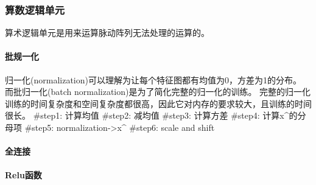 \subsubsection{算数逻辑单元}
算术逻辑单元是用来运算脉动阵列无法处理的运算的。

\paragraph{批规一化}
归一化(normalization)可以理解为让每个特征图都有均值为0，方差为1的分布。
而批归一化(batch normalization)是为了简化完整的归一化的训练。
完整的归一化训练的时间复杂度和空间复杂度都很高，因此它对内存的要求较大，且训练的时间很长。
#step1: 计算均值
#step2: 减均值 
#step3: 计算方差
#step4: 计算x^的分母项
#step5: normalization->x^
#step6: scale and shift

\paragraph{全连接}

\paragraph{Relu函数}


